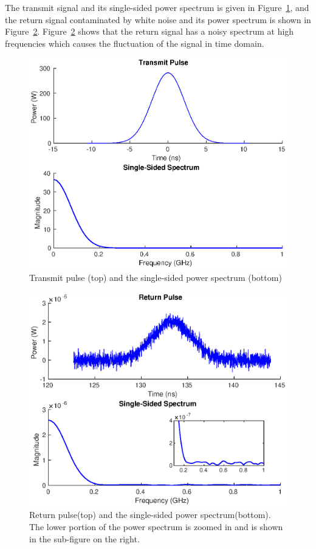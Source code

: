 The transmit signal and its single-sided power spectrum is given in Figure~\ref{fig:AFE_transmit}, and the return signal contaminated by white noise and its power spectrum is shown in Figure~\ref{fig:AFE_return}. Figure~\ref{fig:AFE_return} shows that the return signal has a noisy spectrum at high frequencies which causes the fluctuation of the signal in time domain. 
\begin{figure}[t!p]
\centering
\includegraphics[width=1\textwidth]{figures/chapter_AFE/sig_start.eps}
\caption{Transmit pulse (top) and the single-sided power spectrum (bottom)}
\label{fig:AFE_transmit}
\end{figure}
%
\begin{figure}[t!p]
\centering
\includegraphics[width=1\textwidth]{figures/chapter_AFE/sig_return.eps}
\caption{Return pulse(top) and the single-sided power spectrum(bottom). The lower portion of the power spectrum is zoomed in and is shown in the sub-figure on the right.}
\label{fig:AFE_return}
\end{figure}
